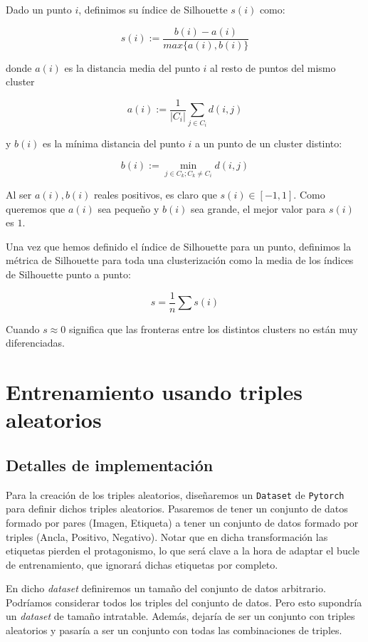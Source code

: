 \documentclass[11pt]{article}
\begin{document}
Dado un punto $i$, definimos su índice de Silhouette $s(i)$ como:

$$s(i) := \frac{b(i) - a(i)}{max\{a(i), b(i)\}}$$

donde $a(i)$ es la distancia media del punto $i$ al resto de puntos del mismo cluster

$$a(i) := \frac{1}{|C_i|} \sum_{j \in C_i} d(i, j)$$

y $b(i)$ es la mínima distancia del punto $i$ a un punto de un cluster distinto:

$$b(i) := \min_{j \in C_k ; C_k \neq C_i} d(i, j)$$

Al ser $a(i), b(i)$ reales positivos, es claro que $s(i) \in [-1, 1]$. Como queremos que $a(i)$ sea pequeño y $b(i)$ sea grande, el mejor valor para $s(i)$ es $1$.

Una vez que hemos definido el índice de Silhouette para un punto, definimos la métrica de Silhouette para toda una clusterización como la media de los índices de Silhouette punto a punto:

$$s = \frac{1}{n} \sum s(i)$$

Cuando $s \approx 0$ significa que las fronteras entre los distintos clusters no están muy diferenciadas.

\pagebreak

\section{Entrenamiento usando triples aleatorios}

\subsection{Detalles de implementación}

Para la creación de los triples aleatorios, diseñaremos un \lstinline{Dataset} de \lstinline{Pytorch} para definir dichos triples aleatorios. Pasaremos de tener un conjunto de datos formado por pares (Imagen, Etiqueta) a tener un conjunto de datos formado por triples (Ancla, Positivo, Negativo). Notar que en dicha transformación las etiquetas pierden el protagonismo, lo que será clave a la hora de adaptar el bucle de entrenamiento, que ignorará dichas etiquetas por completo.

En dicho \emph{dataset} definiremos un tamaño del conjunto de datos arbitrario. Podríamos considerar todos los triples del conjunto de datos. Pero esto supondría un \emph{dataset} de tamaño intratable. Además, dejaría de ser un conjunto con triples aleatorios y pasaría a ser un conjunto con todas las combinaciones de triples.
\end{document}
